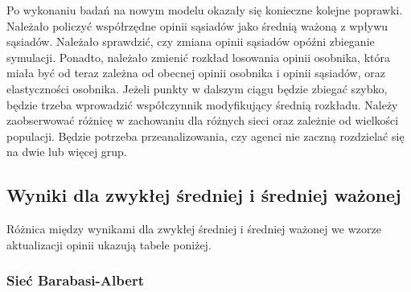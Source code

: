 \documentclass{wfiisul}
\begin{document}
Po wykonaniu badań na nowym modelu okazały się konieczne kolejne poprawki. 
Należało policzyć współrzędne opinii sąsiadów jako średnią ważoną z wpływu sąsiadów. 
Należało sprawdzić, czy zmiana opinii sąsiadów opóźni zbieganie symulacji. 
Ponadto, należało zmienić rozkład losowania opinii osobnika, która miała być od teraz zależna od obecnej opinii osobnika i opinii sąsiadów, oraz elastyczności osobnika. 
Jeżeli punkty w dalszym ciągu będzie zbiegać szybko, będzie trzeba wprowadzić współczynnik modyfikujący średnią rozkładu. 
Należy zaobserwować różnicę w zachowaniu dla różnych sieci oraz zależnie od wielkości populacji. 
Będzie potrzeba przeanalizowania, czy agenci nie zaczną rozdzielać się na dwie lub więcej grup. 

\subsection{Wyniki dla zwykłej średniej i średniej ważonej}

Różnica między wynikami dla zwykłej średniej i średniej ważonej we wzorze aktualizacji opinii ukazują tabele poniżej. 

\subsubsection{Sieć Barabasi-Albert}
\end{document}
